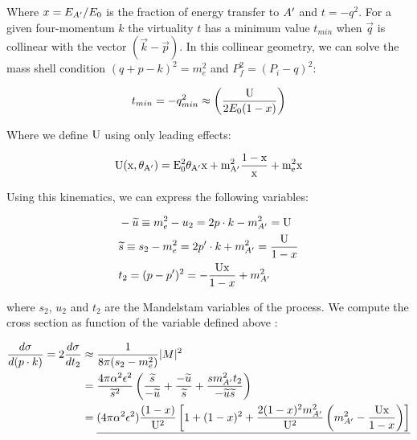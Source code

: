  Where $x=E_{A'}/E_0$ is the fraction of energy transfer to $A'$ and $t=-q^2$. For a given four-momentum $k$ the virtuality $t$ has a minimum value $t_{min}$ when $\vec{q}$ is collinear with the vector $(\vec{k} - \vec{p})$. In this collinear geometry, we can solve the mass shell condition $(q + p - k)^2 = m^2_e$ and $P^2_f = (P_i - q)^2$:

 \begin{equation}
   \label{eq:t-min}
   t_{min} = -q^2_{min} \approx \left(\frac{\rm{U}}{2E_0 (1 - x)} \right)
 \end{equation}

 Where we define $\rm{U}$ using only leading effects:

 \begin{equation}
   \label{eq:dp-u}
   \rm{U}(x, \theta_{A'}) = E_0^2 \theta_{A'}x + m^2_{A'} \frac{1-x}{x} + m^2_e x
 \end{equation}

 Using this kinematics, we can express the following variables:

 \begin{equation}
   \label{eq:dp-md-var}
   \begin{aligned}
     &-\widetilde{u} \equiv m_e^2 - u_2 = 2p\cdot k - m^2_{A'} = \rm{U}\\
     &\widetilde{s}  \equiv s_2 - m_e^2 = 2p' \cdot k + m^2_{A'} = \frac{\rm{U}}{1-x} \\
     &t_2 = (p - p')^2 = - \frac{\rm{U}x}{1-x} + m^2_{A'}
   \end{aligned}
 \end{equation}

 where $s_2$, $u_2$ and $t_2$ are the Mandelstam variables of the process. We compute the cross section as function of the variable defined above \cite{jdb}:

 \begin{equation}
   \label{eq:dp-cs-comp}
   \begin{aligned}
     \frac{d \sigma}{d(p \cdot k)} = 2 \frac{d\sigma}{dt_2} &\approx \frac{1}{8 \pi (s_2 - m^2_e)} |M|^2 \\
     &=\frac{4 \pi \alpha^2 \epsilon^2}{\widetilde{s}^2} \left( \frac{\widetilde{s}}{-\widetilde{u}} + \frac{-\widetilde{u}}{\widetilde{s}} + \frac{s m^2_{A'} t_2}{-\widetilde{u}\widetilde{s}} \right) \\
           &=\underline{(4 \pi \alpha^2 \epsilon^2) \frac{(1-x)}{\rm{U}^2} \left[ 1 + (1 - x)^2 + \frac{2(1-x)^2m^2_{A'}}{\rm{U}^2} \left( m^2_{A'} - \frac{\rm{U}x}{1-x} \right) \right]}
   \end{aligned}
 \end{equation}

